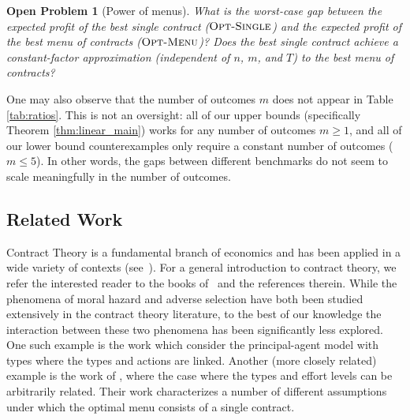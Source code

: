 \documentclass{article}
\newtheorem{problem}{Open Problem}
\newcommand{\jonnote}[1]{}
\newcommand{\ggnote}[1]{}
\newcommand{\OMenu}{\textsc{Opt-Menu}}
\newcommand{\OSingle}{\textsc{Opt-Single}}
\begin{document}
\begin{problem}[Power of menus]
What is the worst-case gap between the expected profit of the best single contract ($\OSingle$) and the expected profit of the best menu of contracts ($\OMenu$)? Does the best single contract achieve a constant-factor approximation (independent of $n$, $m$, and $T$) to the best menu of contracts?
\end{problem}

One may also observe that the number of outcomes $m$ does not appear in Table \ref{tab:ratios}. This is not an oversight: all of our upper bounds (specifically Theorem \ref{thm:linear_main}) works for any number of outcomes $m \geq 1$, and all of our lower bound counterexamples only require a constant number of outcomes ($m \leq 5$). In other words, the gaps between different benchmarks do not seem to scale meaningfully in the number of outcomes. 



\subsection{Related Work}


Contract Theory is a fundamental branch of economics and has been applied in a wide variety of contexts (see~\cite{nobel2016oliver}). For a general introduction to contract theory, we refer the interested reader to the books of~\cite{bolton2005contract,laffont2009theory} and the references therein. While the phenomena of moral hazard and adverse selection have both been studied extensively in the contract theory literature, to the best of our knowledge the interaction between these two phenomena has been significantly less explored. One such example is the work \cite{Laffont1986linked} which consider the principal-agent model with types where the types and actions are linked. Another (more closely related) example is the work of \cite{gottlieb2015simple}, where the case where the types and effort levels can be arbitrarily related.  Their work characterizes a number of different assumptions under which the optimal menu consists of a single contract. 
\end{document}
